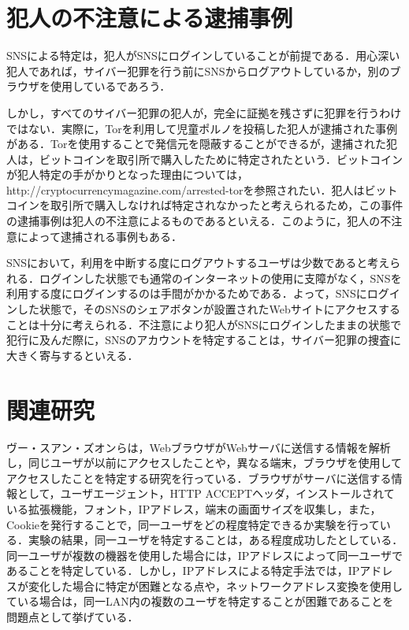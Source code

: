 \documentclass[10pt, a4paper]{jreport}
\begin{document}
\section{犯人の不注意による逮捕事例}
SNSによる特定は，犯人がSNSにログインしていることが前提である．用心深い犯人であれば，サイバー犯罪を行う前にSNSからログアウトしているか，別のブラウザを使用しているであろう．

しかし，すべてのサイバー犯罪の犯人が，完全に証拠を残さずに犯罪を行うわけではない．実際に，Torを利用して児童ポルノを投稿した犯人が逮捕された事例がある．Torを使用することで発信元を隠蔽することができるが，逮捕された犯人は，ビットコインを取引所で購入したために特定されたという\cite{arrest_by_bitcoin}．ビットコインが犯人特定の手がかりとなった理由については，http://cryptocurrencymagazine.com/arrested-torを参照されたい．犯人はビットコインを取引所で購入しなければ特定されなかったと考えられるため，この事件の逮捕事例は犯人の不注意によるものであるといえる．このように，犯人の不注意によって逮捕される事例もある．

SNSにおいて，利用を中断する度にログアウトするユーザは少数であると考えられる．ログインした状態でも通常のインターネットの使用に支障がなく，SNSを利用する度にログインするのは手間がかかるためである．よって，SNSにログインした状態で，そのSNSのシェアボタンが設置されたWebサイトにアクセスすることは十分に考えられる．不注意により犯人がSNSにログインしたままの状態で犯行に及んだ際に，SNSのアカウントを特定することは，サイバー犯罪の捜査に大きく寄与するといえる．

\section{関連研究}
ヴー・スアン・ズオンらは，WebブラウザがWebサーバに送信する情報を解析し，同じユーザが以前にアクセスしたことや，異なる端末，ブラウザを使用してアクセスしたことを特定する研究を行っている\cite{relevant_research_fingerprint}．ブラウザがサーバに送信する情報として，ユーザエージェント，HTTP ACCEPTヘッダ，インストールされている拡張機能，フォント，IPアドレス，端末の画面サイズを収集し，また，Cookieを発行することで，同一ユーザをどの程度特定できるか実験を行っている．実験の結果，同一ユーザを特定することは，ある程度成功したとしている．同一ユーザが複数の機器を使用した場合には，IPアドレスによって同一ユーザであることを特定している．しかし，IPアドレスによる特定手法では，IPアドレスが変化した場合に特定が困難となる点や，ネットワークアドレス変換を使用している場合は，同一LAN内の複数のユーザを特定することが困難であることを問題点として挙げている．
\end{document}
